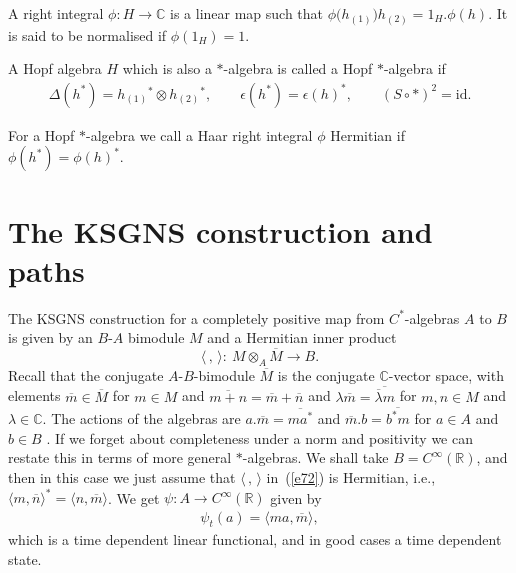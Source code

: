 \documentclass[pdftex]{sigma}
\numberwithin{equation}{section}
\newcommand{\id}{\mathrm{id}}
\newcommand{\tens}{\mathop{\otimes}}
\newcommand{\R}{\mathbb{R}}
\newcommand{\C}{\mathbb{C}}
\newcommand{\<}{\langle}
\renewcommand{\>}{\rangle}
\begin{document}
\begin{Definition}A right integral $ \phi\colon H\rightarrow \C $ is a linear map such that $ \phi \big(h_{(1)}\big) h_{(2)}=1_{H}. \phi (h)$. It is said to be normalised if $ \phi (1_{H}) =1$.
\end{Definition}
\begin{Definition} A Hopf algebra $ H $ which is also a $ * $-algebra is called a Hopf $ * $-algebra if
\begin{gather*}
	\Delta(h^{*})=h_{(1)}{}^{*}\tens h_{(2)}{}^{*},\qquad \epsilon(h^{*})=\epsilon(h)^{*}, \qquad (S\circ *)^{2}=\id.
\end{gather*}
\end{Definition}
For a Hopf $ * $-algebra we call a Haar right integral $ \phi $ Hermitian if $ \phi(h^{*}) =\phi(h)^{*}$.

\section{The KSGNS construction and paths}\label{Ch1}
The KSGNS construction \cite{Lance} for a completely positive map from $ C^{*} $-algebras $ A $ to $ B $ is given by an $ B $-$ A $ bimodule $ M $ and a Hermitian inner product
\begin{equation}\label{e72}
\langle\, ,\,\rangle\colon \ M \tens_{A} \overline{M} \longrightarrow B.
\end{equation}
Recall that the conjugate $ A$-$B $-bimodule $ \overline{M}$ is the conjugate $ \C $-vector space, with elements $ \overline{m}\in \overline{M} $ for $ m\in M $ and $ \overline{m+n}=\overline{m}+\overline{n} $ and $ \lambda \overline{m}=\overline{\overline{\lambda}m} $ for $ m,n \in M $ and $ \lambda \in \C $. The actions of the algebras are $ a. \overline{m}= \overline{m a^{*}} $ and $ \overline{m}. b= \overline{b^{*}m} $ for $ a \in A $ and $ b \in B $ \cite{BMBarcategories}. If we forget about completeness under a norm and positivity we can restate this in terms of more general $ * $-algebras. We shall take $ B= C^\infty(\R)$, and then in this case we just assume that $ \<\,,\,\> $ in~(\ref{e72}) is Hermitian, i.e., $ \<m,\overline{n}\>^{*} =\<n, \overline{m}\>$. We get $ \psi\colon A\rightarrow C^\infty(\R) $ given by
\begin{align}\label{e50}
\psi_t (a)=\langle m a, \overline{m}\rangle,
\end{align}
which is a time dependent linear functional, and in good cases a time dependent state.
\end{document}
